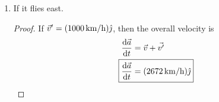 \documentclass[../psets.tex]{subfiles}
\begin{document}
\begin{enumerate}
\begin{enumerate}
        \begin{proof}
            If $\vec{v}'=(\SI[per-mode=symbol]{1000}{\kilo\meter\per\hour})\jhat$, then the overall velocity is
            \begin{align*}
                \dv{\vec{a}}{t} &= \vec{v}-\vec{v'}\\
                \Aboxed{\dv{\vec{a}}{t} &= (\SI[per-mode=symbol]{672}{\kilo\meter\per\hour})\jhat}
            \end{align*}
        \end{proof}
        \item If it flies east.
        \begin{proof}
            If $\vec{v}'=(\SI[per-mode=symbol]{1000}{\kilo\meter\per\hour})\jhat$, then the overall velocity is
            \begin{align*}
                \dv{\vec{a}}{t} &= \vec{v}+\vec{v'}\\
                \Aboxed{\dv{\vec{a}}{t} &= (\SI[per-mode=symbol]{2672}{\kilo\meter\per\hour})\jhat}
            \end{align*}
        \end{proof}
    \end{enumerate}
\end{enumerate}
\end{document}
